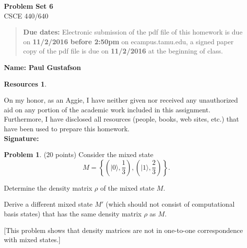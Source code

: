 \documentclass{article}
\theoremstyle{definition}
\newtheorem{problem}{Problem}
\newtheorem*{resources}{Resources}
\newcommand{\ket}[1]{|#1\rangle}
\newcommand{\name}[1]{\noindent\textbf{Name: #1}}
\newcommand{\honor}{\noindent On my honor, as an Aggie, I have neither
  given nor received any unauthorized aid on any portion of the
  academic work included in this assignment. Furthermore, I have
  disclosed all resources (people, books, web sites, etc.) that have
  been used to prepare this homework. \\[1ex]
 \textbf{Signature:} \underline{\hspace*{5cm}} }
\newcommand{\problemset}[1]{\begin{center}\textbf{Problem Set #1}\\ 
CSCE 440/640\end{center}}
\newcommand{\duedate}[2]{\begin{quote}\textbf{Due dates:} Electronic
    submission of the pdf file of this homework is due on \textbf{#1} on ecampus.tamu.edu, a signed paper copy
    of the pdf file is due on \textbf{#2} at the beginning of
    class. \end{quote} }
\begin{document}
\problemset{6}
\duedate{11/2/2016 before 2:50pm}{11/2/2016}
\name{ Paul Gustafson }
\begin{resources} 
\end{resources}
\honor

\newpage

\noindent 
\begin{problem}{(20 points)}
Consider the mixed state 
$$ M= \left\{ \left(\ket{0}, \frac{1}{3}\right), \left(\ket{1}, \frac{2}{3}\right)\right\}.$$
\begin{compactenum}[(a)]
\item Determine the density matrix $\rho$ of the mixed state $M$. 
\item Derive a different mixed state $M'$ (which should not consist of
  computational basis states) that has the same density matrix
  $\rho$ as $M$. 
\end{compactenum}
[This problem shows that density matrices are not in one-to-one
correspondence with mixed states.]
\end{problem}
\end{document}

